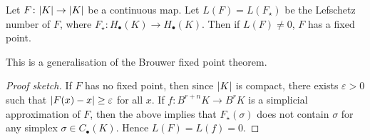 \begin{theorem}
	Let \( F \colon \abs{K} \to \abs{K} \) be a continuous map.
	Let \( L(F) = L(F_\star) \) be the Lefschetz number of \( F \), where \( F_\star \colon H_\bullet(K) \to H_\bullet(K) \).
	Then if \( L(F) \neq 0 \), \( F \) has a fixed point.
\end{theorem}
\begin{remark}
	This is a generalisation of the Brouwer fixed point theorem.
\end{remark}
\begin{proof}[Proof sketch]
	If \( F \) has no fixed point, then since \( \abs{K} \) is compact, there exists \( \varepsilon > 0 \) such that \( \abs{F(x) - x} \geq \varepsilon \) for all \( x \).
	If \( f \colon B^{r+n} K \to B^r K \) is a simplicial approximation of \( F \), then the above implies that \( F_\star(\sigma) \) does not contain \( \sigma \) for any simplex \( \sigma \in C_\bullet(K) \).
	Hence \( L(F) = L(f) = 0 \).
\end{proof}
